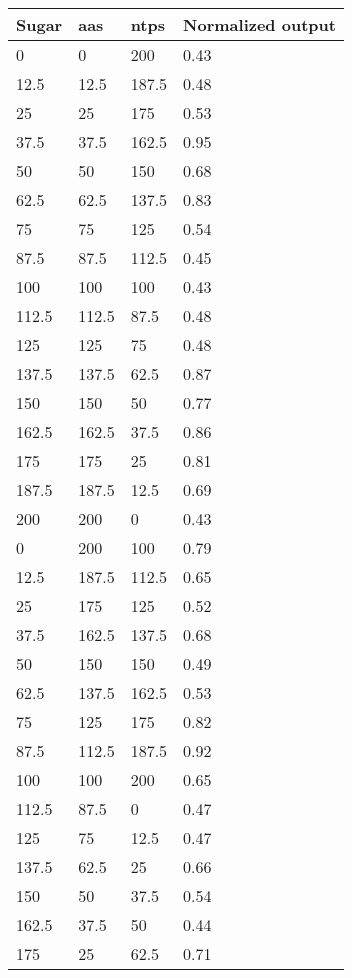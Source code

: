 \begin{longtable}{lll | l}
Sugar & \glspl{aa} & \glspl{ntp} & Normalized output   \\ \hline
0        & 0     & 200   & 0.43 \\
12.5     & 12.5  & 187.5 & 0.48 \\
25       & 25    & 175   & 0.53 \\
37.5     & 37.5  & 162.5 & 0.95 \\
50       & 50    & 150   & 0.68 \\
62.5     & 62.5  & 137.5 & 0.83 \\
75       & 75    & 125   & 0.54 \\
87.5     & 87.5  & 112.5 & 0.45 \\
100      & 100   & 100   & 0.43 \\
112.5    & 112.5 & 87.5  & 0.48 \\
125      & 125   & 75    & 0.48 \\
137.5    & 137.5 & 62.5  & 0.87 \\
150      & 150   & 50    & 0.77 \\
162.5    & 162.5 & 37.5  & 0.86 \\
175      & 175   & 25    & 0.81 \\
187.5    & 187.5 & 12.5  & 0.69 \\
200      & 200   & 0     & 0.43 \\
0        & 200   & 100   & 0.79 \\
12.5     & 187.5 & 112.5 & 0.65 \\
25       & 175   & 125   & 0.52 \\
37.5     & 162.5 & 137.5 & 0.68 \\
50       & 150   & 150   & 0.49 \\
62.5     & 137.5 & 162.5 & 0.53 \\
75       & 125   & 175   & 0.82 \\
87.5     & 112.5 & 187.5 & 0.92 \\
100      & 100   & 200   & 0.65 \\
112.5    & 87.5  & 0     & 0.47 \\
125      & 75    & 12.5  & 0.47 \\
137.5    & 62.5  & 25    & 0.66 \\
150      & 50    & 37.5  & 0.54 \\
162.5    & 37.5  & 50    & 0.44 \\
175      & 25    & 62.5  & 0.71 \\

\end{longtable}
